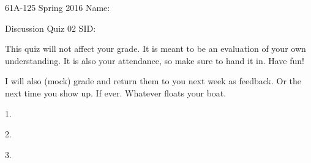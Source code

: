 \documentclass[12pt]{article}
\begin{document}
61A-125 Spring 2016 \hfill{Name:} {\underline {\hspace{2.5in}}}

Discussion Quiz 02 \hfill{SID:} {\underline {\hspace{2.5in}}}
\newline
\newline

This quiz will not affect your grade. It is meant to be an evaluation of your own understanding. It is also your attendance, so make sure to hand it in. Have fun!\newline

I will also (mock) grade and return them to you next week as feedback. Or the next time you show up. If ever. Whatever floats your boat.
\vspace{2pc}

1.
\vfill

2.
\vfill

3.
\vfill
\end{document}
